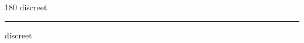 
\begin{frame}
\begin{center}
\begin{turn}{180}
{\fontsize{2.5cm}{1em}\selectfont discreet}
\end{turn}
\vspace{1em}\par  
\hrule
\vspace{1em}\par  
{\fontsize{2.5cm}{1em}\selectfont discreet}
\end{center}
\end{frame}
